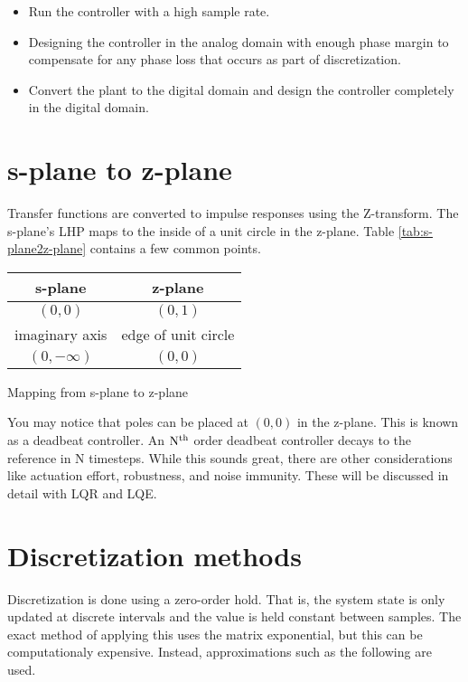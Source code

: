 \begin{itemize}
  \item Run the controller with a high sample rate.
  \item Designing the controller in the analog domain with enough phase margin
    to compensate for any phase loss that occurs as part of discretization.
  \item Convert the \gls{plant} to the digital domain and design the controller
    completely in the digital domain.
\end{itemize}

\section{s-plane to z-plane}

Transfer functions are converted to impulse responses using the Z-transform. The
s-plane's LHP maps to the inside of a unit circle in the z-plane. Table
\ref{tab:s-plane2z-plane} contains a few common points.

\begin{booktable}
  \begin{tabular}{|cc|}
    \hline
    \rowcolor{headingbg}
    \textbf{s-plane} & \textbf{z-plane} \\
    \hline
    $(0, 0)$ & $(0, 1)$ \\
    imaginary axis & edge of unit circle \\
    $(0, -\infty)$ & $(0, 0)$ \\
    \hline
  \end{tabular}
  \caption{Mapping from s-plane to z-plane}
  \label{tab:s-plane2z-plane}
\end{booktable}

You may notice that poles can be placed at $(0, 0)$ in the z-plane. This is
known as a deadbeat controller. An $\rm N^{th}$ order deadbeat controller decays
to the \gls{reference} in N timesteps. While this sounds great, there are other
considerations like actuation effort, \gls{robustness}, and
\gls{noise immunity}. These will be discussed in detail with LQR and LQE.

\section{Discretization methods}

Discretization is done using a zero-order hold. That is, the system state is
only updated at discrete intervals and the value is held constant between
samples. The exact method of applying this uses the matrix exponential, but this
can be computationaly expensive. Instead, approximations such as the following
are used.

